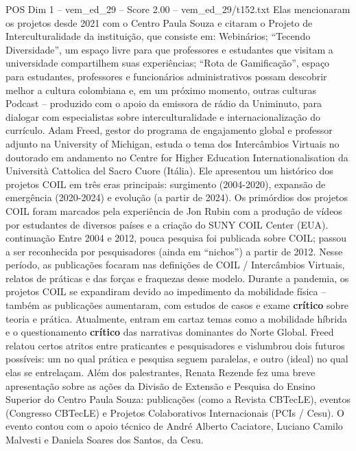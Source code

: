 \begin{textsample}{POS Dim 1 – vem\_ed\_29 – Score 2.00 – vem\_ed\_29/t152.txt}
Elas mencionaram os projetos desde 2021 com o Centro Paula Souza e citaram o Projeto de Interculturalidade da instituição, que consiste em: Webinários; “Tecendo Diversidade”, um espaço livre para que professores e estudantes que visitam a universidade compartilhem suas experiências; “Rota de Gamificação”, espaço para estudantes, professores e funcionários administrativos possam descobrir melhor a cultura colombiana e, em um próximo momento, outras culturas Podcast – produzido com o apoio da emissora de rádio da Uniminuto, para dialogar com especialistas sobre interculturalidade e internacionalização do currículo.
Adam Freed, gestor do programa de engajamento global e professor adjunto na University of Michigan, estuda o tema dos Intercâmbios Virtuais no doutorado em andamento no Centre for Higher Education Internationalisation da Università Cattolica del Sacro Cuore (Itália).
Ele apresentou um histórico dos projetos COIL em três eras principais: surgimento (2004-2020), expansão de emergência (2020-2024) e evolução (a partir de 2024).
Os primórdios dos projetos COIL foram marcados pela experiência de Jon Rubin com a produção de vídeos por estudantes de diversos países e a criação do SUNY COIL Center (EUA). continuação Entre 2004 e 2012, pouca pesquisa foi publicada sobre COIL; passou a ser reconhecida por pesquisadores (ainda em “nichos”) a partir de 2012.
Nesse período, as publicações focaram nas definições de COIL / Intercâmbios Virtuais, relatos de práticas e das forças e fraquezas desse modelo.
Durante a pandemia, os projetos COIL se expandiram devido ao impedimento da mobilidade física – também as publicações aumentaram, com estudos de casos e exame \textbf{crítico} sobre teoria e prática.
Atualmente, entram em cartaz temas como a mobilidade híbrida e o questionamento \textbf{crítico} das narrativas dominantes do Norte Global.
Freed relatou certos atritos entre praticantes e pesquisadores e vislumbrou dois futuros possíveis: um no qual prática e pesquisa seguem paralelas, e outro (ideal) no qual elas se entrelaçam.
Além dos palestrantes, Renata Rezende fez uma breve apresentação sobre as ações da Divisão de Extensão e Pesquisa do Ensino Superior do Centro Paula Souza: publicações (como a Revista CBTecLE), eventos (Congresso CBTecLE) e Projetos Colaborativos Internacionais (PCIs / Cesu).
O evento contou com o apoio técnico de André Alberto Caciatore, Luciano Camilo Malvesti e Daniela Soares dos Santos, da Cesu.

\end{textsample}
